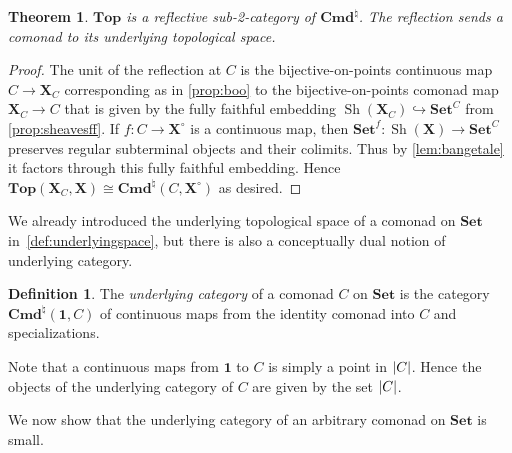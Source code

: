 \documentclass[11pt, oneside, article]{memoir}
\theoremstyle{plain}
\newtheorem{theorem}{Theorem}[section]
\theoremstyle{definition}
\newtheorem{definition}[def]{Definition}
\theoremstyle{remark}
\DeclareMathOperator{\Sh}{Sh}
\DeclarePairedDelimiter{\abs}{\lvert}{\rvert}
\newcommand{\namedcat}[1]{\mathbf{#1}}
\newcommand{\spa}[1]{\mathbf{#1}}
\newcommand{\Set}{\namedcat{Set}}
\renewcommand{\Top}{\namedcat{Top}}
\newcommand{\Con}{\namedcat{Cmd}^\natural}
\newcommand{\ConSet}{\Con}
\newcommand{\CoalgOn}[2]{{#2}^{#1}}
\newcommand{\CoalgSet}[1]{\CoalgOn{#1}{\Set}}
\newcommand{\clift}[1]{\overline{#1}}
\newcommand{\pts}[1]{{\abs{#1}}}
\newcommand{\one}[1]{\pts{#1}}
\newcommand{\ptlift}[1]{\overline{#1}}
\newcommand{\carr}{\Sigma}
\newcommand{\reindex}[1]{\Delta_{#1}}
\newcommand{\point}{\mathbf{1}}
\newcommand{\car}[1]{\carr^{#1}}
\newcommand{\ph}[1]{#1}
\newcommand{\con}[2]{{#1}^{#2}}
\newcommand{\topbasis}[1]{\pP_{#1}}
\newcommand{\Ho}[1]{#1}
\newcommand{\cmnd}[1]{{#1}}
\newcommand{\cC}{\cmnd{C}}
\newcommand{\pP}{\ph{P}}
\newcommand{\tX}{\spa{X}}
\newcommand{\cX}{\toptocmd{\tX}}
\newcommand{\CSet}{\CoalgSet{\cC}}
\newcommand{\SetpC}{\Set^\pts{\cC}}
\newcommand{\toptocmd}[1]{{{#1}^\circ}}
\newcommand{\cmdtotop}[1]{{\tX_{#1}}}
\newcommand{\pointcmd}{\point}
\newcommand{\opens}[1]{\mathcal{O}(#1)}
\begin{document}
\begin{theorem}\label{thm:topreflection}
  $\Top$ is a reflective sub-2-category of $\ConSet$. The reflection
  sends a comonad to its underlying topological space.
\end{theorem}
\begin{proof}
  The unit of the reflection at $\cC$ is the bijective-on-points
  continuous map $\cC \to \cmdtotop{\cC}$ corresponding as in
  \cref{prop:boo} to the bijective-on-points comonad map
  $\cmdtotop{\cC} \to \cC$ that is given by the fully faithful
  embedding $\Sh(\cmdtotop{\cC}) \hookrightarrow \CSet$ from
  \cref{prop:sheavesff}. If $f \colon \cC \to \cX$ is a
  continuous map, then $\con{\Set}{f} \colon \Sh(\tX) \to \CSet$ preserves
  regular subterminal objects and their colimits. Thus by
  \cref{lem:bangetale} it factors through this fully faithful
  embedding. Hence
  $\Ho{\Top}(\cmdtotop{\cC}, \tX) \cong \Ho{\ConSet}(\cC,
  \cX)$ as desired.
\end{proof}


We already introduced the underlying topological space of a comonad on
$\Set$ in~\cref{def:underlyingspace}, but there is also a conceptually
dual notion of underlying category.

\begin{definition}\label{def:undercat}
  The \emph{underlying category} of a comonad $\cC$ on $\Set$ is the
  category $\Ho{\ConSet}(\pointcmd, \cC)$ of continuous maps from the
  identity comonad into $\cC$ and specializations.
\end{definition}

Note that a continuous maps from $\pointcmd$ to $\cC$ is simply a
point in $\pts{\cC}$. Hence the objects of the underlying category of
$\cC$ are given by the set $\pts{\cC}$.

We now show that the underlying category of an arbitrary comonad on
$\Set$ is small.
\end{document}
